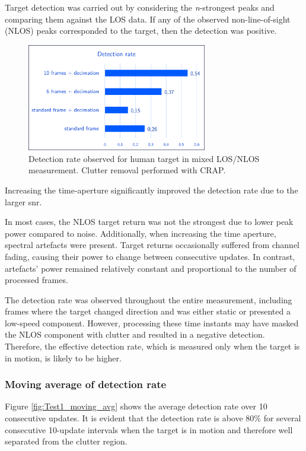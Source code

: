 Target detection was carried out by considering the \textit{n}-strongest peaks and comparing them against the LOS data. If any of the observed non-line-of-sight (NLOS) peaks corresponded to the target, then the detection was positive.

\begin{figure}[H]
	\centering
	\includegraphics[width=0.7\textwidth]{Images/Test1/detect_hist/detect_hist_human_LMsans.png}
	\caption{Detection rate observed for human target in mixed LOS/NLOS measurement. Clutter removal performed with CRAP.}
	\label{fig:Test1_detect_hist}
\end{figure}

Increasing the time-aperture significantly improved the detection rate due to the larger \gls{snr}.

In most cases, the NLOS target return was not the strongest due to lower peak power compared to noise. Additionally, when increasing the time aperture, spectral artefacts were present.
Target returns occasionally suffered from channel fading, causing their power to change between consecutive updates. In contrast, artefacts' power remained relatively constant and proportional to the number of processed frames.

The detection rate was observed throughout the entire measurement, including frames where the target changed direction and was either static or presented a low-speed component. However, processing these time instants may have masked the NLOS component with clutter and resulted in a negative detection. Therefore, the effective detection rate, which is measured only when the target is in motion, is likely to be higher.


\subsubsection{Moving average of detection rate}

Figure \ref{fig:Test1_moving_avg} shows the average detection rate over 10 consecutive updates. It is evident that the detection rate is above 80\% for several consecutive 10-update intervals when the target is in motion and therefore well separated from the clutter region.


